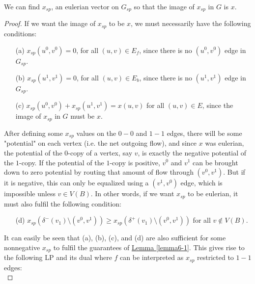 \documentclass[./main.tex]{subfiles}
\begin{document}
			\begin{lemma}\label{lemma6-1}
				We can find $x_{sp}$, an eulerian vector on $G_{sp}$ so that the image of $x_{sp}$ in $G$ is $x$.
			\end{lemma}
			\begin{proof}
			If we want the image of $x_{sp}$ to be $x$, we must necessarily have the following conditions:
				\begin{itemize}
					\item[(a)] $x_{sp}(u^0,v^0) = 0$, for all $(u,v)\in E_f$, since there is no $(u^0,v^0)$ edge in $G_{sp}$.
					\item[(b)] $x_{sp}(u^1,v^1) = 0$, for all $(u,v)\in E_b$, since there is no $(u^1,v^1)$ edge in $G_{sp}$.
					\item[(c)] $x_{sp}(u^0,v^0)+x_{sp}(u^1,v^1) = x(u,v)$ for all $(u,v)\in E$, since the image of $x_{sp}$ in $G$ must be $x$.\\
				\end{itemize}
	After defining some $x_{sp}$ values on the $0-0$ and $1-1$ edges, there will be some "potential" on each vertex (i.e. the net outgoing flow), and since $x$ was eulerian, the potential of the $0$-copy of a vertex, say $v$, is exactly the negative potential of the $1$-copy.
			If the potential of the $1$-copy is positive, $v^0$ and $v^1$ can be brought down to zero potential by routing that amount of flow through $(v^0,v^1)$.
			But if it is negative, this can only be equalized using a $(v^1,v^0)$ edge, which is impossible unless $v\in V(B)$. In other words, if we want $x_{sp}$ to be eulerian, it must also fulfil the following condition:
			\begin{itemize}
				\item[(d)] $x_{sp}(\delta^-(v_1)\setminus (v^0,v^1) )\geqslant x_{sp}(\delta^+(v_1)\setminus (v^0,v^1))$ for all $v\notin V(B)$.
			\end{itemize}

			It can easily be seen that (a), (b), (c), and (d) are also sufficient for some nonnegative $x_{sp}$ to fulfil the guarantees of \hyperref[lemma6-1]{Lemma \ref{lemma6-1}}.
			 This gives rise to the following LP and its dual where $f$ can be interpreted as $x_{sp}$ restricted to $1-1$ edges:\\
			 \vspace{2mm}


\end{proof}
\end{document}
